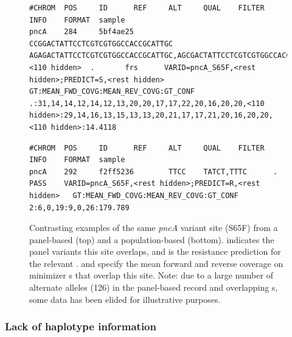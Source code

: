 \begin{figure}
\begin{Verbatim}[breaklines=true,breakanywhere=true,frame=single,framerule=0.5mm,fontsize=\footnotesize,label=\textit{pncA} mutation S65F VCF entry for panel-based \prg{}]
#CHROM  POS     ID      REF     ALT     QUAL    FILTER  INFO    FORMAT  sample
pncA    284     5bf4ae25        CCGGACTATTCCTCGTCGTGGCCACCGCATTGC       AGAGACTATTCCTCGTCGTGGCCACCGCATTGC,AGCGACTATTCCTCGTCGTGGCCACCGCATTGC,AGGGACTATTCCTCGTCGTGGCCACCGCATTGC,AGTGACTATTCCTCGTCGTGGCCACCGCATTGC,CAAGACTATTCCTCGTCGTGGCCACCGCATTGC,CAGGACTATTCCTCGTCGTGGCCACCGCATTGC,CCAGACTATTCCTCGTCGTGGCCACCGCATTGC,CCCGACTATTCCTCGTCGTGGCCACCGCATTGC,CCGCACTATTCCTCGTCGTGGCCACCGCATTGC,CCGCATTATTCCTCGTCGTGGCCACCGCATTGC,CCGGAATATTCCTCGTCGTGGCCACCGCATTGC,CCGGACTAATCCTCGTCGTGGCCACCGCATTGC,CCGGACTAGTCCTCGTCGTGGCCACCGCATTGC,CCGGACTATTCCCCATCGTGGCCACCGCATTGC,CCGGACTATTCCCCCTCGTGGCCACCGCATTGC,CCGGACTATTCCCCGTCGTGGCCACCGCATTGC,<110 hidden>  .       frs      VARID=pncA_S65F,<rest hidden>;PREDICT=S,<rest hidden>       GT:MEAN_FWD_COVG:MEAN_REV_COVG:GT_CONF      .:31,14,14,12,14,12,13,20,20,17,17,22,20,16,20,20,<110 hidden>:29,14,16,13,15,13,13,20,21,17,17,21,20,16,20,20,<110 hidden>:14.4118
\end{Verbatim}
\begin{Verbatim}[breaklines=true,breakanywhere=true,frame=single,framerule=0.5mm,fontsize=\footnotesize,label=\textit{pncA} mutation S65F VCF entry for population-based \prg{}]
#CHROM  POS     ID      REF     ALT     QUAL    FILTER  INFO    FORMAT  sample
pncA    292     f2ff5236        TTCC    TATCT,TTTC      .       PASS    VARID=pncA_S65F,<rest hidden>;PREDICT=R,<rest hidden>   GT:MEAN_FWD_COVG:MEAN_REV_COVG:GT_CONF     2:6,0,19:9,0,26:179.789
\end{Verbatim}
\caption{Contrasting examples of the same \textit{pncA} variant site (S65F) from a panel-based \prg{} (top) and a population-based \prg{} (bottom).  indicates the panel variants this site overlaps, and  is the resistance prediction for the relevant .  and  specify the mean forward and reverse \kmer{} coverage on minimizer \kmer{}s that overlap this site. Note: due to a large number of alternate alleles (126) in the panel-based record and overlapping s, some data has been elided for illustrative purposes.}
\label{fig:example-pncA-dense}
\end{figure}

\subsubsection{Lack of haplotype information}

